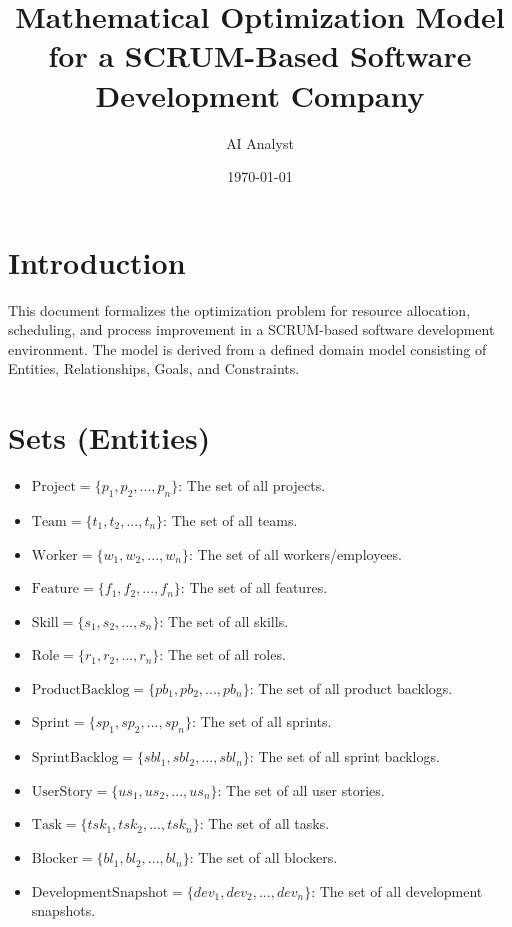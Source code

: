 \documentclass[11pt]{article}
\title{Mathematical Optimization Model for a SCRUM-Based Software Development Company}
\author{AI Analyst}
\date{\today}
\begin{document}
\maketitle
\tableofcontents
\newpage

\section*{Introduction}
This document formalizes the optimization problem for resource allocation, scheduling, and process improvement in a SCRUM-based software development environment. The model is derived from a defined domain model consisting of Entities, Relationships, Goals, and Constraints.

\section{Sets (Entities)}
\begin{itemize}
    \item $\text{Project} = \{p_1, p_2, ..., p_n\}$: The set of all projects.
    \item $\text{Team} = \{t_1, t_2, ..., t_n\}$: The set of all teams.
    \item $\text{Worker} = \{w_1, w_2, ..., w_n\}$: The set of all workers/employees.
    \item $\text{Feature} = \{f_1, f_2, ..., f_n\}$: The set of all features.
    \item $\text{Skill} = \{s_1, s_2, ..., s_n\}$: The set of all skills.
    \item $\text{Role} = \{r_1, r_2, ..., r_n\}$: The set of all roles.
    \item $\text{ProductBacklog} = \{pb_1, pb_2, ..., pb_n\}$: The set of all product backlogs.
    \item $\text{Sprint} = \{sp_1, sp_2, ..., sp_n\}$: The set of all sprints.
    \item $\text{SprintBacklog} = \{sbl_1, sbl_2, ..., sbl_n\}$: The set of all sprint backlogs.
    \item $\text{UserStory} = \{us_1, us_2, ..., us_n\}$: The set of all user stories.
    \item $\text{Task} = \{tsk_1, tsk_2, ..., tsk_n\}$: The set of all tasks.
    \item $\text{Blocker} = \{bl_1, bl_2, ..., bl_n\}$: The set of all blockers.
    \item $\text{DevelopmentSnapshot} = \{dev_1, dev_2, ..., dev_n\}$: The set of all development snapshots.
\end{itemize}
\end{document}
